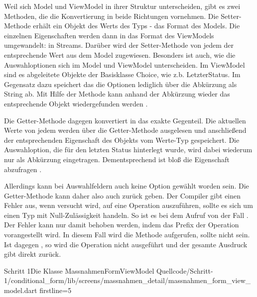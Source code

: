 Weil sich Model und ViewModel in ihrer Struktur unterscheiden, gibt es zwei Methoden, die die Konvertierung in beide Richtungen vornehmen.
Die Setter-Methode   erhält ein Objekt des Werts des Typs  - das Format des Models.
Die einzelnen Eigenschaften werden dann in das Format des ViewModels umgewandelt: in Streams.
Darüber wird der Setter-Methode  von jedem  der entsprechende Wert aus dem Model zugewiesen.
Besonders ist auch, wie die Auswahloptionen sich im Model und ViewModel unterscheiden.  Im ViewModel sind es abgeleitete Objekte der Basisklasse Choice, wie z.b. LetzterStatus.  Im Gegensatz dazu speichert das  die Optionen lediglich über die Abkürzung als String ab. Mit Hilfe der Methode  kann anhand der Abkürzung wieder das entsprechende Objekt wiedergefunden werden .

Die Getter-Methode dagegen konvertiert in das exakte Gegenteil.
Die aktuellen Werte von jedem  werden über die Getter-Methode  ausgelesen und anschließend der entsprechenden Eigenschaft des Objekts vom Werte-Typ  gespeichert.
Die Auswahloption, die für den letzten Status hinterlegt wurde, wird dabei wiederum nur als Abkürzung eingetragen.
Dementsprechend ist bloß die Eigenschaft  abzufragen .

Allerdings kann bei Auswahlfeldern auch keine Option gewählt worden sein.
Die Getter-Methode  kann daher also auch  zurück geben.
Der Compiler gibt einen Fehler aus, wenn versucht wird, auf  eine Operation auszuführen, sollte es sich um einen Typ mit Null-Zulässigkeit handeln.
So ist es bei dem Aufruf von  der Fall .
Der Fehler kann nur damit behoben werden, indem das Prefix   der Operation vorangestellt wird.
In diesem Fall wird die Methode aufgerufen, sollte  nicht  sein.
Ist  dagegen , so wird die Operation nicht ausgeführt und der gesamte Ausdruck gibt direkt  zurück.

\begin{alexlisting}{Schritt 1}{Die Klasse MassnahmenFormViewModel}
  {Quellcode/Schritt-1/conditional_form/lib/screens/massnahmen_detail/massnahmen_form_view_model.dart}
  {firstline=5}
  \label{lst:Schritt1KlasseMassnahmenFormViewModel}
\end{alexlisting}

